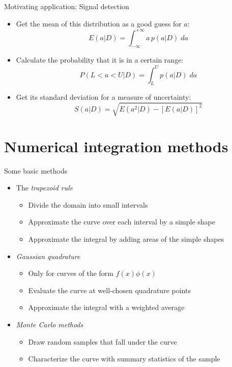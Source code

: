 \documentclass{beamer}
\begin{document}
\begin{frame}{Motivating application: Signal detection}
\begin{itemize}
\item Get the mean of this distribution as a good guess for $a$: $$E(a | D) = \int_{-\infty}^{+\infty} a\, p(a | D)\;da$$
\item Calculate the probability that it is in a certain range: $$P(L < a < U | D) = \int_L^U p(a | D)\;da$$
\item Get its standard deviation for a measure of uncertainty: $$S(a | D) = \sqrt{E(a^2 | D) - \left[E(a | D)\right]^2}$$
\end{itemize}
\end{frame}



\section{Numerical integration methods}


\begin{frame}{Some basic methods}
\begin{itemize}
\item The \emph{trapezoid rule}
\begin{itemize}
\item Divide the domain into small intervals
\item Approximate the curve over each interval by a simple shape
\item Approximate the integral by adding areas of the simple shapes
\end{itemize}
\item \emph{Gaussian quadrature}
\begin{itemize}
\item Only for curves of the form $f(x)\phi(x)$
\item Evaluate the curve at well-chosen quadrature points
\item Approximate the integral with a weighted average
\end{itemize}
\item \emph{Monte Carlo methods}
\begin{itemize}
\item Draw random samples that fall under the curve
\item Characterize the curve with summary statistics of the sample
\end{itemize}
\end{itemize}
\end{frame}
\end{document}
